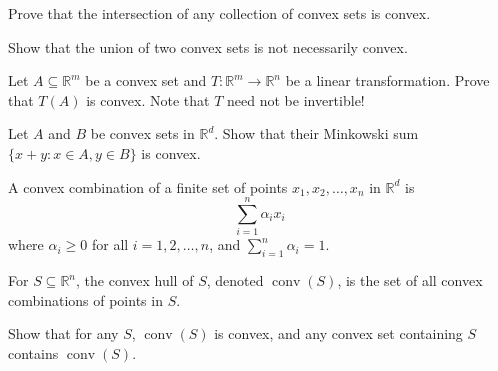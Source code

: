 \documentclass{article}
\DeclareMathOperator{\conv}{conv}
\begin{document}
\begin{exercise}

Prove that the intersection of any collection of convex sets is convex.

\end{exercise}



\begin{exercise}

Show that the union of two convex sets is not necessarily convex.

\end{exercise}



\begin{exercise}

Let $A\subseteq \mathbb{R}^m$ be a convex set and $T:\mathbb{R}^m\rightarrow\mathbb{R}^n$ be a linear transformation. Prove that $T(A)$ is convex. Note that $T$ need not be invertible!

\end{exercise}



\begin{exercise}

Let $A$ and $B$ be convex sets in $\mathbb{R}^d$. Show that their Minkowski sum $\{x+y:x\in A,y\in B\}$ is convex.

\end{exercise}



\begin{definition}

A convex combination of a finite set of points $x_1,x_2,\ldots,x_n$ in $\mathbb{R}^d$ is
\[\sum_{i=1}^n\alpha_ix_i\]
where $\alpha_i\ge 0$ for all $i=1,2,\ldots,n$, and $\sum_{i=1}^n\alpha_i=1$.

\end{definition}

\begin{definition}

For $S\subseteq\mathbb{R}^n$, the convex hull of $S$, denoted $\conv(S)$, is the set of all convex combinations of points in $S$.

\end{definition}



\begin{exercise}

Show that for any $S$, $\conv(S)$ is convex, and any convex set containing $S$ contains $\conv(S)$.

\end{exercise}
\end{document}
